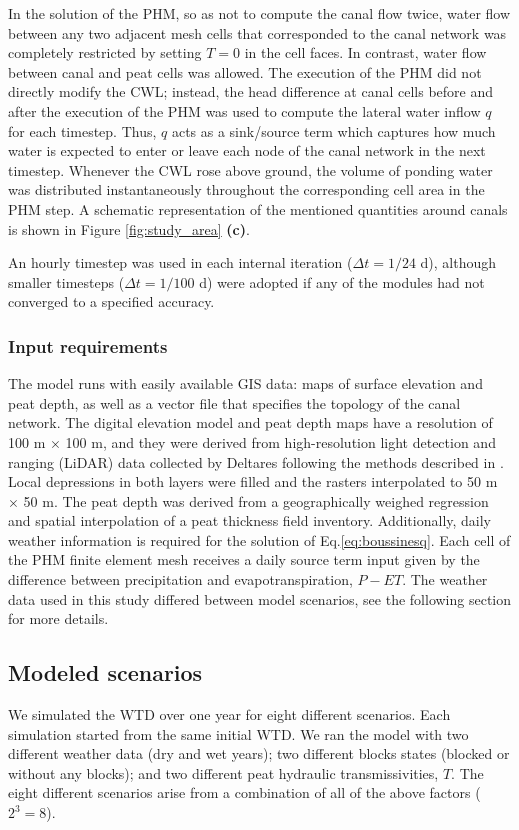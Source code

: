 \documentclass[bg, manuscript]{copernicus}
\begin{document}
In the solution of the PHM, so as not to compute the canal flow twice, water flow between any two adjacent mesh cells that corresponded to the canal network was completely restricted by setting $T=0$ in the cell faces.
In contrast, water flow between canal and peat cells was allowed. 
The execution of the PHM did not directly modify the CWL; instead, the head difference at canal cells before and after the execution of the PHM was used to compute the lateral water inflow $q$ for each timestep.
Thus, $q$ acts as a sink/source term which captures how much water is expected to enter or leave each node of the canal network in the next timestep.
Whenever the CWL rose above ground, the volume of ponding water was distributed instantaneously throughout the corresponding cell area in the PHM step.
A schematic representation of the mentioned quantities around canals is shown in Figure \ref{fig:study_area} \textbf{(c)}.

An hourly timestep was used in each internal iteration ($\Delta t = 1/24$ \unit{d}), although smaller timesteps ($\Delta t = 1/100$ \unit{d}) were adopted if any of the modules had not converged to a specified accuracy.

\subsubsection{Input requirements}
The model runs with easily available GIS data: maps of surface elevation and peat depth, as well as a vector file that specifies the topology of the canal network.
The digital elevation model and peat depth maps have a resolution of 100 \unit{m} $\times$ 100 \unit{m}, and they were derived from high-resolution light detection and ranging (LiDAR) data collected by Deltares following the methods described in \cite{vernimmenMappingDeepPeat2020}. 
Local depressions in both layers were filled and the rasters interpolated to 50 \unit{m} $\times$ 50 \unit{m}.
The peat depth was derived from a geographically weighed regression and spatial interpolation of a peat thickness field inventory.
Additionally, daily weather information is required for the solution of Eq.\eqref{eq:boussinesq}.
Each cell of the PHM finite element mesh receives a daily source term input given by  the difference between precipitation and evapotranspiration, $P -ET$.
The weather data used in this study differed between model scenarios, see the following section for more details.

\subsection{Modeled scenarios}
We simulated the WTD over one year for eight different scenarios.
Each simulation started from the same initial WTD.
We ran the model with two different weather data (dry and wet years); two different blocks states (blocked or without any blocks); and two different peat hydraulic transmissivities, $T$.
The eight different scenarios arise from a combination of all of the above factors ($2^3 = 8$).
\end{document}
